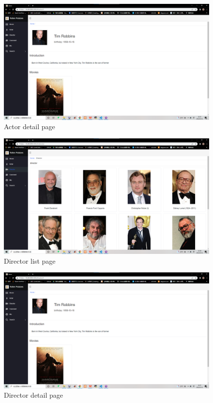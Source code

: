 \begin{CJK*}{UTF8}{gbsn}
    \begin{figure}[htbp]
    \centering
    \includegraphics[width=1\textwidth]{res_actor2.png}
    \caption{Actor detail page}
    \end{figure}
    
    \begin{figure}[htbp]
    \centering
    \includegraphics[width=1\textwidth]{res_dir1.png}
    \caption{Director list page}
    \end{figure}
    
    \begin{figure}[htbp]
    \centering
    \includegraphics[width=1\textwidth]{res_actor2.png}
    \caption{Director detail page}
    \end{figure}
    

\end{CJK*}
